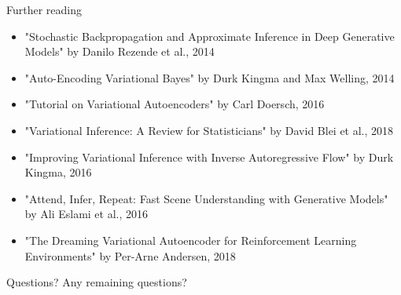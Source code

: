 \documentclass[10pt,aspectratio=169,handout]{beamer}
\begin{document}
\begin{frame}{Further reading}
    \begin{itemize}
        \item "Stochastic Backpropagation and Approximate Inference in Deep Generative Models" by Danilo Rezende et al., 2014
        \item "Auto-Encoding Variational Bayes" by Durk Kingma and Max Welling, 2014
        \item "Tutorial on Variational Autoencoders" by Carl Doersch, 2016
        \item "Variational Inference: A Review for Statisticians" by David Blei et al., 2018
        \item "Improving Variational Inference with Inverse Autoregressive Flow" by Durk Kingma, 2016
        \item "Attend, Infer, Repeat: Fast Scene Understanding with Generative Models" by Ali Eslami et al., 2016
        \item "The Dreaming Variational Autoencoder for Reinforcement Learning Environments" by Per-Arne Andersen, 2018
    \end{itemize}
\end{frame}

\begin{frame}{Questions?}
    \center
    Any remaining questions?
\end{frame}

\appendix
\end{document}
